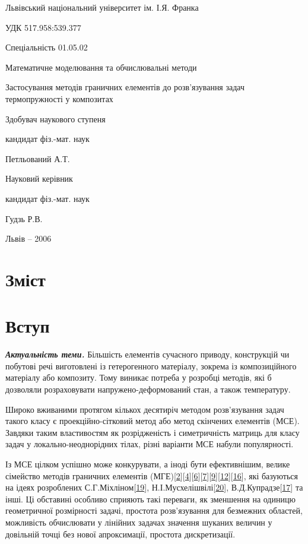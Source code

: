 Львівський національний університет ім. І.Я. Франка

УДК 517.958:539.377

Спеціальність 01.05.02

Математичне моделювання та обчислювальні методи

Застосування методів граничних елементів до розв'язування задач
термопружності у композитах

Здобувач наукового ступеня

кандидат фіз.-мат. наук

Петльований А.Т.

Науковий керівник

кандидат фіз.-мат. наук

Гудзь Р.В.

Львів -- 2006

\hypertarget{ux437ux43cux456ux441ux442}{%
\section[Зміст]{\texorpdfstring{\protect\hypertarget{anchor}{}{}Зміст}{Зміст}}\label{ux437ux43cux456ux441ux442}}

\hypertarget{ux432ux441ux442ux443ux43f}{%
\section[Вступ]{\texorpdfstring{\protect\hypertarget{anchor-1}{}{}Вступ}{Вступ}}\label{ux432ux441ux442ux443ux43f}}

\emph{\textbf{Актуальність теми.}} Більшість елементів сучасного
приводу, конструкцій чи побутові речі виготовлені із гетерогенного
матеріалу, зокрема із композиційного матеріалу або композиту. Тому
виникає потреба у розробці методів, які б дозволяли розраховувати
напружено-деформований стан, а також температуру.

Широко вживаними протягом кількох десятиріч методом розв'язування задач
такого класу є проекційно-сітковий метод або метод скінчених елементів
(МСЕ). Завдяки таким властивостям як розрідженість і симетричність
матриць для класу задач у локально-неоднорідних тілах, різні варіанти
МСЕ набули популярності.

Із МСЕ цілком успішно може конкурувати, а іноді бути ефективнішим,
велике сімейство методів граничних елементів
(МГЕ){[}\protect\hyperlink{anchor-2}{2}{]}{[}\protect\hyperlink{anchor-3}{4}{]}{[}\protect\hyperlink{anchor-4}{6}{]}{[}\protect\hyperlink{anchor-5}{7}{]}{[}\protect\hyperlink{anchor-6}{9}{]}{[}\protect\hyperlink{anchor-7}{12}{]}{[}\protect\hyperlink{anchor-8}{16}{]},
які базуються на ідеях розроблених
С.Г.Міхліном{[}\protect\hyperlink{anchor-9}{19}{]},
Н.І.Мусхелішвілі{[}\protect\hyperlink{anchor-10}{20}{]},
В.Д.Купрадзе{[}\protect\hyperlink{anchor-11}{17}{]} та інші. Ці
обставині особливо сприяють такі переваги, як зменшення на одиницю
геометричної розмірності задачі, простота розв'язування для безмежних
областей, можливість обчислювати у лінійних задачах значення шуканих
величин у довільній точці без нової апроксимації, простота
дискретизації.

